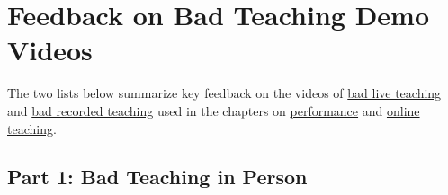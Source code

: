 \documentclass[10pt,statementpaper]{memoir}
\begin{document}
\section{Feedback on Bad Teaching Demo
Videos}\label{feedback-on-bad-teaching-demo-videos}

The two lists below summarize key feedback on the videos of
\href{biblio.html\#wilson-bad-teaching-live}{bad live teaching} and
\href{biblio.html\#wilson-bad-teaching-recorded}{bad recorded teaching}
used in the chapters on \href{performance.html}{performance} and
\href{online.html}{online teaching}.

\subsection*{Part 1: Bad Teaching in
Person}\label{part-1-bad-teaching-in-person}
\end{document}
